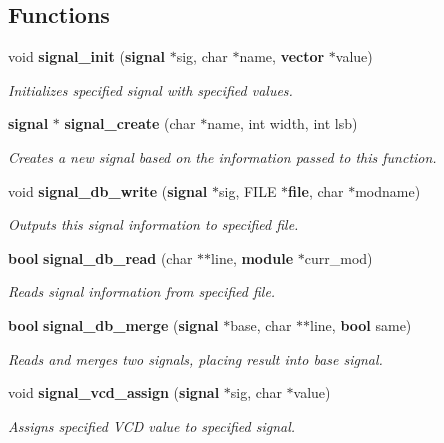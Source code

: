 \subsection*{Functions}
\begin{CompactItemize}
\item 
void {\bf signal\_\-init} ({\bf signal} $\ast$sig, char $\ast$name, {\bf vector} $\ast$value)
\begin{CompactList}\small\item\em Initializes specified signal with specified values.\item\end{CompactList}\item 
{\bf signal} $\ast$ {\bf signal\_\-create} (char $\ast$name, int width, int lsb)
\begin{CompactList}\small\item\em Creates a new signal based on the information passed to this function.\item\end{CompactList}\item 
void {\bf signal\_\-db\_\-write} ({\bf signal} $\ast$sig, FILE $\ast${\bf file}, char $\ast$modname)
\begin{CompactList}\small\item\em Outputs this signal information to specified file.\item\end{CompactList}\item 
{\bf bool} {\bf signal\_\-db\_\-read} (char $\ast$$\ast$line, {\bf module} $\ast$curr\_\-mod)
\begin{CompactList}\small\item\em Reads signal information from specified file.\item\end{CompactList}\item 
{\bf bool} {\bf signal\_\-db\_\-merge} ({\bf signal} $\ast$base, char $\ast$$\ast$line, {\bf bool} same)
\begin{CompactList}\small\item\em Reads and merges two signals, placing result into base signal.\item\end{CompactList}\item 
void {\bf signal\_\-vcd\_\-assign} ({\bf signal} $\ast$sig, char $\ast$value)
\begin{CompactList}\small\item\em Assigns specified VCD value to specified signal.\item\end{CompactList}\item 

\end{CompactItemize}
